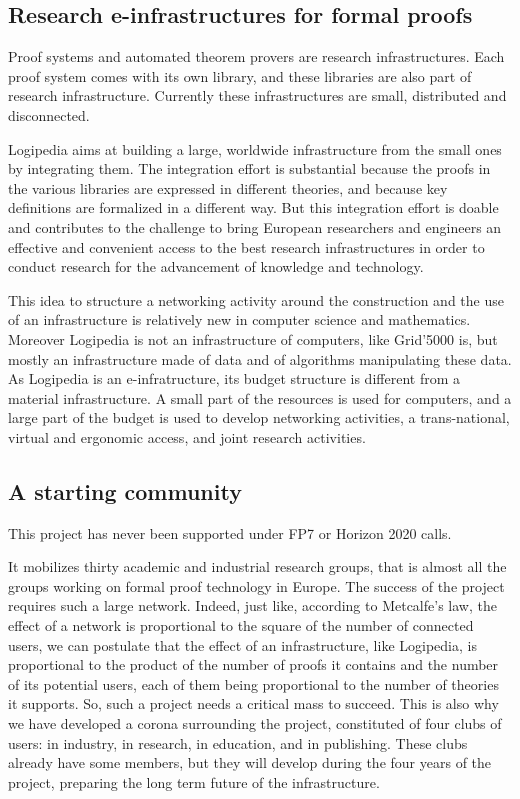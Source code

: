 \subsection{Research e-infrastructures for formal proofs}

Proof systems and automated theorem provers are research
infrastructures. Each proof system comes with its own library, and
these libraries are also part of research infrastructure.  Currently
these infrastructures are small, distributed and disconnected.

Logipedia aims at building a large, worldwide infrastructure from the
small ones by integrating them.  The integration effort is substantial
because the proofs in the various libraries are expressed in different
theories, and because key definitions are formalized in a different
way.  But this integration effort is doable and contributes to the
challenge to bring European researchers and engineers an effective and
convenient access to the best research infrastructures in order to
conduct research for the advancement of knowledge and technology.

This idea to structure a networking activity around the construction
and the use of an infrastructure is relatively new in computer science
and mathematics. Moreover Logipedia is not an infrastructure of
computers, like Grid'5000 is, but mostly an infrastructure made of
data and of algorithms manipulating these data.  As Logipedia is an
e-infratructure, its budget structure is different from a material
infrastructure. A small part of the resources is used for computers,
and a large part of the budget is used to develop networking
activities, a trans-national, virtual and ergonomic access, and joint
research activities.

\subsection{A starting community}

This project has never been supported under FP7 or Horizon 2020 calls.

It mobilizes thirty academic and industrial research groups, that is
almost all the groups working on formal proof technology in Europe.
The success of the project requires such a large network.  Indeed,
just like, according to Metcalfe's law, the effect of a network is
proportional to the square of the number of connected users, we can
postulate that the effect of an infrastructure, like Logipedia, is
proportional to the product of the number of proofs it contains and
the number of its potential users, each of them being proportional to
the number of theories it supports. So, such a project needs a
critical mass to succeed. This is also why we have developed a corona
surrounding the project, constituted of four clubs of users: in
industry, in research, in education, and in publishing. These clubs
already have some members, but they will develop during the four years
of the project, preparing the long term future of the infrastructure.


